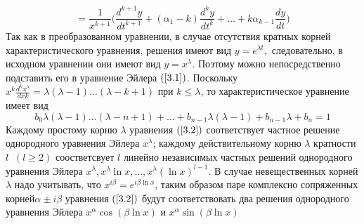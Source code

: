     \begin{equation}
= \frac{1}{x^{k+1}} \Big(\frac{d^{k+1} y}{dt^{k+1}}+(\alpha_1 - k) \frac{d^k y}{dt^k} + \dots + k \alpha_{k-1} \frac{dy}{dt}\Big)
\end{equation}
Так как в преобразованном уравнении, в случае отсутствия
кратных корней характеристического уравнения, решения имеют
вид $y=e^{\lambda t},$ следовательно, в исходном уравнении они имеют вид $y=x^\lambda$. Поэтому можно непосредственно подставить его в уравнение Эйлера $(\ref{3.1})$. Поскольку $x^k\frac{d^kx^\lambda}{dxk}=\lambda(\lambda-1)\dots(\lambda-k+1)$ при $k\leqslant\lambda$, то характеристическое уравнение имеет вид \begin{equation}
\tag{3.2}
\label{3.2}
    b_0\lambda(\lambda-1)\dots(\lambda-n+1)+\dots+b_{n-1}\lambda(\lambda-1)+b_{n-1}\lambda+b_n=1
\end{equation}
Каждому простому корню $\lambda$ уравнения $(\ref{3.2})$ соответствует частное решение однородного уравнения Эйлера $x^\lambda$; каждому действительному корню $\lambda$ кратности $l\;\;(l\geqslant2)$ соостветсвует $l$ линейно
независимых частных решений однородного уравнения Эйлера $x^\lambda,x^\lambda\ln{x},\dots,x^\lambda(\ln{x})^{l-1}$. В случае невещественных корней $\lambda$ надо
учитывать, что $x^{i\beta}=e^{i\beta\ln{x}}$, таким образом паре комплексно сопряженных
корней$\alpha\pm i\beta$ уравнения $(\ref{3.2})$ будут соответствовать два решения
однородного уравнения Эйлера $x^\alpha\cos{(\beta\ln x)}$ и $x^\alpha\sin{(\beta\ln{x})}$
 